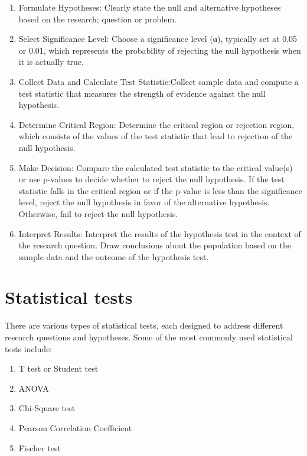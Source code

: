 \documentclass[
]{book}
\providecommand{\tightlist}{%
  \setlength{\itemsep}{0pt}\setlength{\parskip}{0pt}}
\begin{document}
\begin{enumerate}
\def\labelenumi{\arabic{enumi})}
\tightlist
\item
  Formulate Hypotheses: Clearly state the null and alternative hypotheses based on the research; question or problem.
\item
  Select Significance Level: Choose a significance level (α), typically set at 0.05 or 0.01, which represents the probability of rejecting the null hypothesis when it is actually true.
\item
  Collect Data and Calculate Test Statistic:Collect sample data and compute a test statistic that measures the strength of evidence against the null hypothesis.
\item
  Determine Critical Region: Determine the critical region or rejection region, which consists of the values of the test statistic that lead to rejection of the null hypothesis.
\item
  Make Decision: Compare the calculated test statistic to the critical value(s) or use p-values to decide whether to reject the null hypothesis. If the test statistic falls in the critical region or if the p-value is less than the significance level, reject the null hypothesis in favor of the alternative hypothesis. Otherwise, fail to reject the null hypothesis.
\item
  Interpret Results: Interpret the results of the hypothesis test in the context of the research question. Draw conclusions about the population based on the sample data and the outcome of the hypothesis test.
\end{enumerate}

\hypertarget{statistical-tests}{%
\section{Statistical tests}\label{statistical-tests}}

There are various types of statistical tests, each designed to address different research questions and hypotheses. Some of the most commonly used statistical tests include:

\begin{enumerate}
\def\labelenumi{\arabic{enumi}.}
\item
  T test or Student test
\item
  ANOVA
\item
  Chi-Square test
\item
  Pearson Correlation Coefficient
\item
  Fischer test
\end{enumerate}
\end{document}
